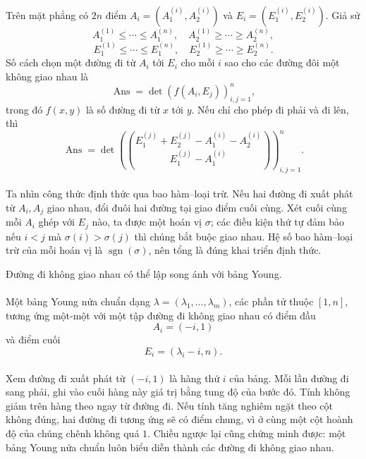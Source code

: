\documentclass[11pt]{article}
\begin{document}
\paragraph{}
Trên mặt phẳng có \(2n\) điểm \(A_i=(A^{(i)}_1,A^{(i)}_2)\) và
\(E_i=(E^{(i)}_1,E^{(i)}_2)\). Giả sử
\[
A^{(1)}_1\le\cdots\le A^{(n)}_1,\quad
A^{(1)}_2\ge\cdots\ge A^{(n)}_2,
\]
\[
E^{(1)}_1\le\cdots\le E^{(n)}_1,\quad
E^{(1)}_2\ge\cdots\ge E^{(n)}_2.
\]
Số cách chọn một đường đi từ \(A_i\) tới \(E_i\) cho mỗi \(i\) sao cho các
đường đôi một không giao nhau là
\[
\operatorname{Ans}=\det(f(A_i,E_j))_{i,j=1}^n,
\]
trong đó \(f(x,y)\) là số đường đi từ \(x\) tới \(y\). Nếu chỉ cho phép đi
phải và đi lên, thì
\[
\operatorname{Ans}=\det\left(
\binom{E^{(j)}_1+E^{(j)}_2-A^{(i)}_1-A^{(i)}_2}
{E^{(j)}_1-A^{(i)}_1}
\right)_{i,j=1}^n.
\]

\paragraph{}
Ta nhìn công thức định thức qua bao hàm--loại trừ. Nếu hai đường đi xuất phát
từ \(A_i,A_j\) giao nhau, đổi đuôi hai đường tại giao điểm cuối cùng. Xét
cuối cùng mỗi \(A_i\) ghép với \(E_j\) nào, ta được một hoán vị \(\sigma\);
các điều kiện thứ tự đảm bảo nếu \(i<j\) mà \(\sigma(i)>\sigma(j)\) thì chúng
bắt buộc giao nhau. Hệ số bao hàm--loại trừ của mỗi hoán vị là
\(\operatorname{sgn}(\sigma)\), nên tổng là đúng khai triển định thức.

Đường đi không giao nhau có thể lập song ánh với bảng Young.

\paragraph{}
Một bảng Young nửa chuẩn dạng
\(\lambda=(\lambda_1,\ldots,\lambda_m)\), các phần tử thuộc \([1,n]\), tương
ứng một-một với một tập đường đi không giao nhau có điểm đầu
\[
A_i=(-i,1)
\]
và điểm cuối
\[
E_i=(\lambda_i-i,n).
\]

\paragraph{}
Xem đường đi xuất phát từ \((-i,1)\) là hàng thứ \(i\) của bảng. Mỗi lần đường
đi sang phải, ghi vào cuối hàng này giá trị bằng tung độ của bước đó. Tính
không giảm trên hàng theo ngay từ đường đi. Nếu tính tăng nghiêm ngặt theo
cột không đúng, hai đường đi tương ứng sẽ có điểm chung, vì ở cùng một cột
hoành độ của chúng chênh không quá \(1\). Chiều ngược lại cũng chứng minh được:
một bảng Young nửa chuẩn luôn biểu diễn thành các đường đi không giao nhau.
\end{document}
